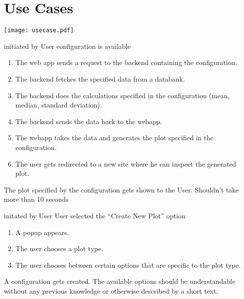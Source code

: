 \section{Use Cases}

\texttt{[image: usecase.pdf]}

{initiated by User}
{\gls{configuration} is available}
{\begin{enumerate}
    \item The web app sends a request to the backend containing the \gls{configuration}.
    \item The backend fetches the specified data from a databank.
    \item The backend does the calculations specified in the \gls{configuration} (mean, median, standard deviation).
    \item The backend sends the data back to the webapp.
    \item The webapp takes the data and generates the plot specified in the \gls{configuration}.
    \item The user gets redirected to a new site where he can inspect the generated plot.
\end{enumerate}}
{The plot specified by the \gls{configuration} gets shown to the User.}
{Shouldn't take more than 10 seconds}

\bigskip

{initated by User}
{User selected the \enquote{Create New Plot} option}
{\begin{enumerate}
    \item A popup appears.
    \item The user chooses a plot type.
    \item The user chooses between certain options that are specific to the plot type.
\end{enumerate}}
{A \gls{configuration} gets created.}
{The available options should be understandable without any previous knowledge or otherwise described by a short text.}

\bigskip

